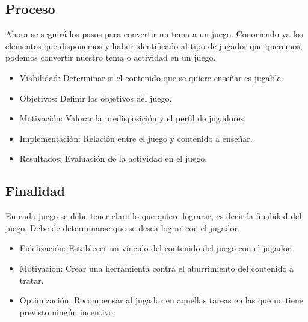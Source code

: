 \subsection{Proceso}
Ahora se seguirá los pasos para convertir un tema a un juego. Conociendo ya los elementos que disponemos y haber identificado al tipo de jugador que queremos, podemos convertir nuestro tema o actividad en un juego. 
\begin{itemize}
	\item Viabilidad: Determinar si el contenido que se quiere enseñar es jugable.
	\item Objetivos: Definir los objetivos del juego.
	\item Motivación: Valorar la predisposición y el perfil de jugadores.
	\item Implementación: Relación entre el juego y contenido a enseñar.
	\item Resultados: Evaluación de la actividad en el juego.
\end{itemize}


\subsection{Finalidad}
En cada juego se debe tener claro lo que quiere lograrse, es decir la finalidad del juego. Debe de determinarse que se desea lograr con el jugador.
\begin{itemize}
	\item Fidelización: Establecer un vínculo del contenido del juego con el jugador.
	\item Motivación: Crear una herramienta contra el aburrimiento del contenido a tratar.
	\item Optimización: Recompensar al jugador en aquellas tareas en las que no tiene previsto ningún incentivo.
\end{itemize}
